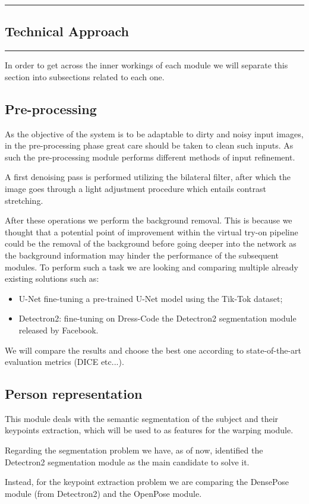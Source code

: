 {\color{gray}\hrule}
\begin{center}
\section{Technical Approach}
\end{center}
{\color{gray}\hrule}


\begin{multicols}{2}
In order to get across the inner workings of each module we will separate this section into subsections related to each one.

\subsection{Pre-processing}
As the objective of the system is to be adaptable to dirty and noisy input images, in the pre-processing phase great care should be taken to clean such inputs. As such the pre-processing module performs different methods of input refinement.

A first denoising pass is performed utilizing the bilateral filter, after which the image goes through a light adjustment procedure which entails contrast stretching.

After these operations we perform the background removal. This is because we thought that a potential point of improvement within the virtual try-on pipeline could be the removal of the background before going deeper into the network as the background information may hinder the performance of the subsequent modules. To perform such a task we are looking and comparing multiple already existing solutions such as:
\begin{itemize}
\item U-Net\cite{u-net} fine-tuning a pre-trained U-Net model using the Tik-Tok dataset;
\item Detectron2\cite{detectron2}: fine-tuning on Dress-Code the Detectron2 segmentation module released by Facebook.
\end{itemize}

We will compare the results and choose the best one according to state-of-the-art evaluation metrics (DICE etc...).



\subsection{Person representation}
This module deals with the semantic segmentation of the subject and their keypoints extraction, which will be used to as features for the warping module.

Regarding the segmentation problem we have, as of now, identified the Detectron2 segmentation module as the main candidate to solve it.

Instead, for the keypoint extraction problem we are comparing the DensePose module (from Detectron2) and the OpenPose module.

\end{multicols}

